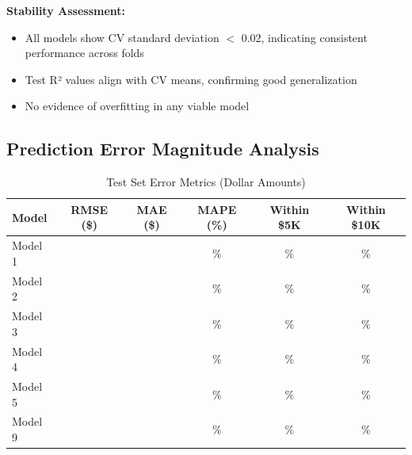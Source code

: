
\textbf{Stability Assessment:}
\begin{itemize}
    \item All models show CV standard deviation $<$ 0.02, indicating consistent performance across folds
    \item Test R² values align with CV means, confirming good generalization
    \item No evidence of overfitting in any viable model
\end{itemize}


\subsection{Prediction Error Magnitude Analysis}

\begin{table}[h!]
\centering
\caption{Test Set Error Metrics (Dollar Amounts)}
\label{tab:error_magnitude}
\begin{tabular}{lccccc}
\toprule
\textbf{Model} & \textbf{RMSE (\$)} & \textbf{MAE (\$)} & \textbf{MAPE (\%)} & \textbf{Within \$5K} & \textbf{Within \$10K} \\
\midrule
Model 1 & \ModelOneRMSETest{} & \ModelOneMAETest{} & \ModelOneMAPETest{}\% & \ModelOneWithinFiveK{}\% & \ModelOneWithinTenK{}\% \\
Model 2 & \ModelTwoRMSETest{} & \ModelTwoMAETest{} & \ModelTwoMAPETest{}\% & \ModelTwoWithinFiveK{}\% & \ModelTwoWithinTenK{}\% \\
Model 3 & \ModelThreeRMSETest{} & \ModelThreeMAETest{} & \ModelThreeMAPETest{}\% & \ModelThreeWithinFiveK{}\% & \ModelThreeWithinTenK{}\% \\
Model 4 & \ModelFourRMSETest{} & \ModelFourMAETest{} & \ModelFourMAPETest{}\% & \ModelFourWithinFiveK{}\% & \ModelFourWithinTenK{}\% \\
Model 5 & \ModelFiveRMSETest{} & \ModelFiveMAETest{} & \ModelFiveMAPETest{}\% & \ModelFiveWithinFiveK{}\% & \ModelFiveWithinTenK{}\% \\
Model 9 & \ModelNineRMSETest{} & \ModelNineMAETest{} & \ModelNineMAPETest{}\% & \ModelNineWithinFiveK{}\% & \ModelNineWithinTenK{}\% \\
\bottomrule
\end{tabular}
\end{table}

